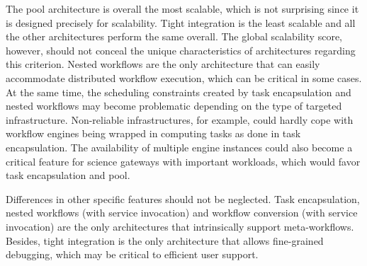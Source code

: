 \documentclass[preprint,3p,twocolumn]{elsarticle}
\begin{document}
The pool architecture is overall the most scalable, which is not
surprising since it is designed precisely for scalability. Tight
integration is the least scalable and all the other architectures
perform the same overall. The global scalability score, however,
should not conceal the unique characteristics of architectures regarding
this criterion. Nested workflows are the only architecture that can
easily accommodate distributed workflow execution, which can be
critical in some cases. At the same time, the scheduling constraints
created by task encapsulation and nested workflows may become problematic  depending on the type of targeted
infrastructure. Non-reliable infrastructures,
for example, could hardly cope with workflow engines being wrapped in
computing tasks as done in task encapsulation. The availability of
multiple engine instances could also become a critical feature for
science gateways with important workloads, which would favor task
encapsulation and pool.

Differences in other specific features should not be neglected. Task encapsulation, nested
workflows (with service invocation) and workflow conversion (with service
invocation) are the only architectures that intrinsically support meta-workflows. Besides,
tight integration is the only architecture that allows
fine-grained debugging, which may be
critical to efficient user support.
\end{document}
